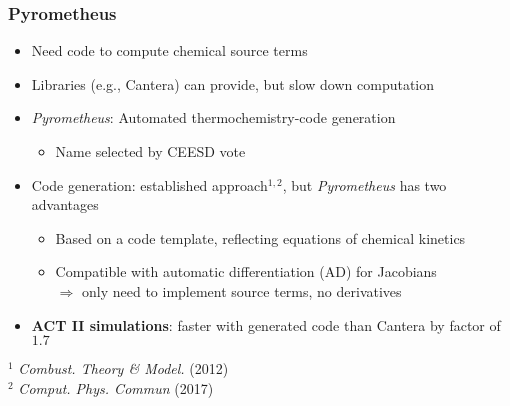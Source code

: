 \documentclass{beamer}
\newcommand{\pie}[3][]{
  \begin{scope}[#1]
    \pgfmathsetmacro{\curA}{90}
    \pgfmathsetmacro{\r}{1}
    \def\c{(0,0)}
    \node[pie title] at (90:1.3) {#2};
    \foreach \v/\s in{#3}{
      \pgfmathsetmacro{\deltaA}{\v/100*360}
      \pgfmathsetmacro{\nextA}{\curA + \deltaA}
      \pgfmathsetmacro{\midA}{(\curA+\nextA)/2}%

      \path[slice,\s] \c
      -- +(\curA:\r)
      arc (\curA:\nextA:\r)
      -- cycle;
      \pgfmathsetmacro{\d}{max((\deltaA * -(.5/50) + 1) , .5)}

      \begin{pgfonlayer}{foreground}
        \path \c -- node[pos=\d,pie values,values of \s]{$\v\%$} +(\midA:\r);
      \end{pgfonlayer}

      \global\let\curA\nextA
    }
  \end{scope}
}
\newcommand{\pielegend}[2][]{
  \begin{scope}[#1]
    \path
    \foreach \n/\s in {#2}{
               ++(0,-10pt) node[\s,legend box,draw=none] {} +(5pt,0) node[legend label] {\n}};
  \end{scope}
}
\begin{document}
\begin{frame}\frametitle{Pyrometheus}

  \begin{itemize}
  \item Need code to compute chemical source terms   
  \item Libraries (e.g., Cantera) can provide, but slow down computation
  \item \textcolor{myOrange}{\textit{Pyrometheus}}: Automated thermochemistry-code generation
    \begin{itemize}
    \item Name selected by CEESD vote
      \begin{center}

        
      \end{center}
    \end{itemize}
  \end{itemize}

  \begin{itemize}
  \item Code generation: established approach${}^{1,2}$, but \textit{Pyrometheus} has two advantages
    \begin{itemize}
    \item Based on a code template, reflecting equations of chemical kinetics
    \item Compatible with automatic differentiation (AD) for Jacobians\\
      $\Rightarrow$ only need to implement source terms, no derivatives
    \end{itemize}
  \item \textbf{ACT II simulations}: faster with generated code than Cantera by factor of $1.7$
  \end{itemize}

  \tiny{${}^{1}$ \textit{Combust. Theory \& Model.} (2012)} \\
  \tiny{${}^{2}$ \textit{Comput. Phys. Commun} (2017)} \\
  
\end{frame}
\end{document}

